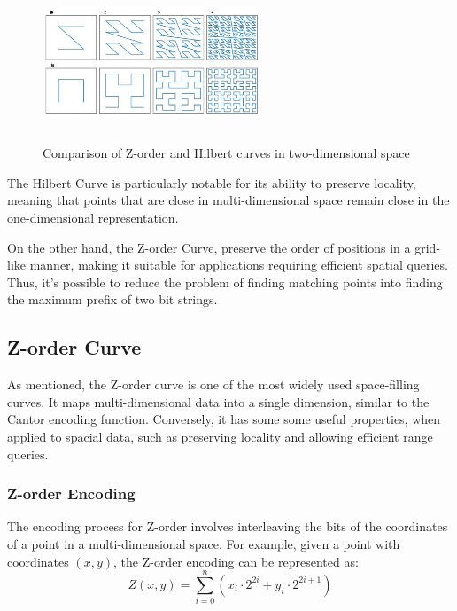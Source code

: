 
\begin{figure}[h]
    \centering
    \includegraphics[width=6.5cm,height=4.7cm]{img/hilbert-z-order.jpg}
    \caption{Comparison of Z-order and Hilbert curves in two-dimensional space}
    \label{fig:space-filling}
\end{figure}

\vspace{5mm}

The Hilbert Curve is particularly notable for its ability to preserve locality, meaning that points that are close in multi-dimensional space remain close in the one-dimensional representation.

On the other hand, the Z-order Curve, preserve the order of positions in a grid-like manner, making it suitable for applications requiring efficient spatial queries. Thus, it's possible to reduce the problem of finding matching points into finding the maximum prefix of two bit strings.

\subsection{Z-order Curve} \label{sec:z-order-curve}
As mentioned, the Z-order curve is one of the most widely used space-filling curves. It maps multi-dimensional data into a single dimension, similar to the Cantor encoding function. Conversely, it has some some useful properties, when applied to spacial data, such as preserving locality and allowing efficient range queries.

\subsubsection{Z-order Encoding}

The encoding process for Z-order involves interleaving the bits of the coordinates of a point in a multi-dimensional space. For example, given a point with coordinates \( (x, y) \), the Z-order encoding can be represented as:
\[
    Z(x, y) = \sum_{i=0}^{n} (x_i \cdot 2^{2i} + y_i \cdot 2^{2i+1})
\]

